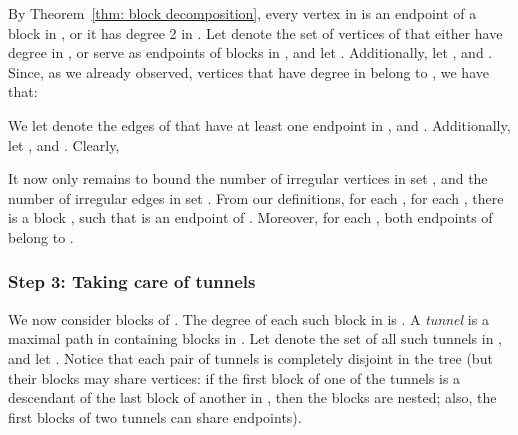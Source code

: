 \documentclass[twoside,leqno,twocolumn]{article}
\begin{document}
By Theorem~\ref{thm: block decomposition}, every vertex in  is an endpoint of 
a block in , or it has degree 2 in . 
Let  denote the set of vertices of  that either have degree  in , or serve as endpoints of blocks in , and let . Additionally, let , and . Since, as we already observed, vertices that have degree  in  belong to , we have that: 
\ifabstract

\fi\iffull

\fi We let  denote the edges of  that have at least one endpoint in , and . Additionally, let , and . Clearly,


It now only remains to bound the number of irregular vertices in set , and the number of irregular edges in set . From our definitions,  for each , for each , there is a block , such that  is an endpoint of . Moreover, for each , both endpoints of  belong to .


\iffalse
In particular every \textit{irregular vertex} in  is an endpoint
of a block in  or has degree 2 in ;
and every \textit{irregular edge} in  is incident to an endpoint of a block or to 
a vertex of degree 2.

Each vertex of degree 2 in  belongs to , so the
total number of such vertices is .
For each , let  denote the vertices that serve as endpoints of blocks in , or that belong to , and let .
By Corollary~\ref{corollary: sizes of R's}, . It now therefore remains to bound the number of irregular vertices in . Each vertex in  is an endpoint of a block in 
 
Similarly, let  denote the set of edges incident to endpoints of blocks
in , their child blocks, and
edges incident to vertices of degree 2 in , and let . Then .
Every edge in  
must belong to a block , where it is adjacent to one of its endpoints.
It now only remains to bound the number of irregular vertices in  and irregular edges in , over all .
\fi

\subsubsection*{Step 3: Taking care of tunnels} 
We now consider blocks of .
The degree of each such block in  is .
A \emph{tunnel}  is a maximal path in  containing blocks in 
.
Let  denote the set of all such tunnels in , and let . Notice that each pair of tunnels is completely 
disjoint in the tree  (but their blocks may share vertices: if the first block of one of the tunnels is a descendant of the last block of another in , then the blocks are nested; also, the first blocks of two tunnels can share endpoints). 
\end{document}
